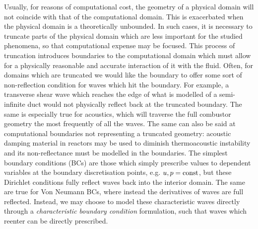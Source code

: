 Usually, for reasons of computational cost, the geometry of a physical domain will not coincide with that of the computational domain. This is exacerbated when the physical domain is a theoretically unbounded. In such cases, it is necessary to truncate parts of the physical domain which are less important for the studied phenomena, so that computational expense may be focused. This process of truncation introduces boundaries to the computational domain which must allow for a physically reasonable and accurate interaction of it with the fluid. Often, for domains which are truncated we would like the boundary to offer some sort of non-reflection condition for waves which hit the boundary. For example, a transverse shear wave which reaches the edge of what is modelled of a semi-infinite duct would not physically reflect back at the truncated boundary. The same is especially true for acoustics, which will traverse the full combustor geometry the most frequently of all the waves. The same can also be said at computational boundaries not representing a truncated geometry: acoustic damping material in reactors may be used to diminish thermoacoustic instability and its non-reflectance must be modelled in the boundaries. The simplest boundary conditions (BCs) are those which simply prescribe values to dependent variables at the boundary discretisation points, e.g. $u, p = \rm {const}$, but these Dirichlet conditions fully reflect waves back into the interior domain. The same are true for Von Neumann BCs, where instead the derivatives of waves are full reflected. Instead, we may choose to model these characteristic waves directly through a \emph{characteristic boundary condition} formulation, such that waves which reenter can be directly prescribed.

